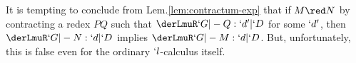 \documentclass{lmcs}
\begin{document}
%
%
%
 

It is tempting to conclude from Lem.\skp\ref{lem:contractum-exp} that if $M \red N$ by contracting a redex $PQ$ such that $ \derLmuR `G |- Q : `d' | `D $ for some $`d'$, then $ \derLmuR `G |- N : `d | `D $ implies $ \derLmuR `G |- M : `d | `D $. 
But, unfortunately, this is false even for the ordinary $`l$-calculus itself. 
\end{document}
